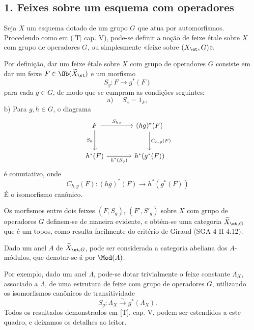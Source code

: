 \subsection*{1. Feixes sobre um esquema com operadores}

Seja $X$ um esquema dotado de um grupo $G$ que atua por automorfismos. Procedendo como em ([T] cap. V), pode-se definir a noção de feixe étale sobre $X$ com grupo de operadores $G$, ou simplesmente «feixe sobre $(X_{\et},G)$».

Por definição, dar um feixe étale sobre $X$ com grupo de operadores $G$ consiste em dar um feixe $F\in \Ob(\widetilde X_{\et})$ e um morfismo
\[
S_g:F\longrightarrow g^*(F)
\]
para cada $g\in G$, de modo que se cumpram as condições seguintes:
\[
\text{a) }\quad S_e=1_F,
\]
b) Para $g,h\in G$, o diagrama
\[
\begin{tikzcd}[column sep=large,row sep=large]
F \arrow[r,"S_{hg}"] \arrow[d,"S_h"'] & (hg)^*(F) \arrow[d,"C_{h,g}(F)"]\\
h^*(F) \arrow[r,"h^*(S_g)"'] & h^*(g^*(F))
\end{tikzcd}
\]
é comutativo, onde
\[
C_{h,g}(F):(hg)^*(F)\longrightarrow h^*(g^*(F))
\]
É o isomorfismo canônico.

Os morfismos entre dois feixes $(F,S_g)$, $(F',S'_g)$ sobre $X$ com grupo de operadores $G$ definem-se de maneira evidente, e obtém-se uma categoria $\widetilde X_{\et,G}$ que é um topos, como resulta facilmente do critério de Giraud (SGA 4 II 4.12).

Dado um anel $A$ de $\widetilde X_{\et,G}$, pode ser considerada a categoria abeliana dos $A$-módulos, que denotar-se-á por $\Mod(A)$.

Por exemplo, dado um anel $\Lambda$, pode-se dotar trivialmente o feixe constante $\Lambda_X$, associado a $\Lambda$, de uma estrutura de feixe com grupo de operadores $G$, utilizando os isomorfismos canônicos de transitividade
\[
S_g:\Lambda_X\xrightarrow{\sim}g^*(\Lambda_X).
\]
Todos os resultados demonstrados em [T], cap. V, podem ser estendidos a este quadro, e deixamos os detalhes ao leitor.

